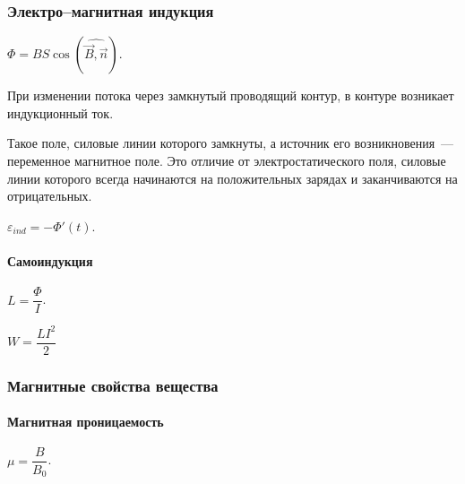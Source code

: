 \documentclass[12pt]{article}
\begin{document}
	\subsubsection{Электро--магнитная индукция}
	
	\begin{definition}
		$\Phi = B S \cos (\widehat{\vec{B}, \vec{n}})$.
	\end{definition}
	
	\begin{law}[Фарадея]
		При изменении потока через замкнутый проводящий контур, в контуре возникает индукционный ток.
	\end{law}
	
	\begin{definition}
		Такое поле, силовые линии которого замкнуты, а источник его возникновения~--- переменное магнитное поле. Это отличие от электростатического поля, силовые линии которого всегда начинаются на положительных зарядах и заканчиваются на отрицательных.
	\end{definition}
	
	\begin{definition}
		$\varepsilon_{ind} = -\Phi' (t)$.
	\end{definition}
	
	\paragraph{Самоиндукция}
	
	\begin{definition}
		$L = \dfrac{\Phi}{I}$.
	\end{definition}
	
	\begin{definition}
		$W = \dfrac{L I^2}{2}$
	\end{definition}
	
	\subsubsection{Магнитные свойства вещества}
	
	\paragraph{Магнитная проницаемость}
	
	\begin{definition}
		$\mu = \dfrac{B}{B_0}$.
	\end{definition}
	
\end{document}
